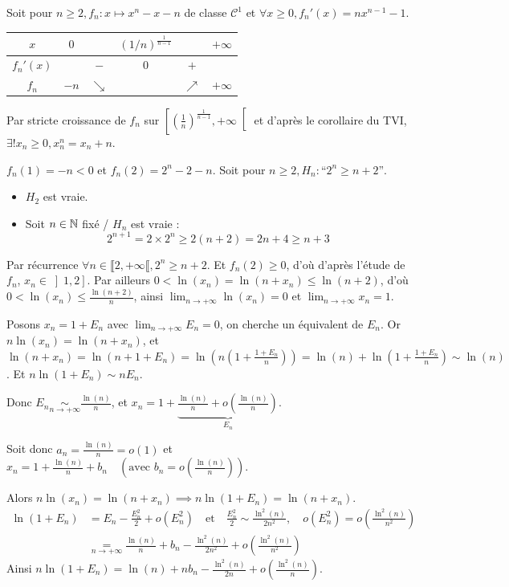 \begin{solution}
Soit pour $n \geq 2, f_n : x \mapsto x^n - x - n$ de classe $\mathcal{C}^1$ et $\forall x \geq 0, f_n'(x) = n x^{n-1} - 1$.
\begin{center}
\begin{tabular}{|c|ccccc|}
\hline
$x$ & $0$ & & $(1/n)^{\frac{1}{n-1}}$ & & $+\infty$ \\
\hline
$f_n'(x)$ & & $-$ & $0$ & $+$ & \\
\hline
$f_n$ & $-n$ & $\searrow$ & & $\nearrow$ & $+\infty$ \\
\hline
\end{tabular}
\end{center}

Par stricte croissance de $f_n$ sur $\left[ \left(\frac{1}{n}\right)^{\frac{1}{n-1}}, +\infty \right[$ et d'après le corollaire du TVI, $\exists! x_n \geq 0, x_n^n = x_n + n$.

$f_n(1) = -n < 0$ et $f_n(2) = 2^n - 2 - n$.
Soit pour $n \geq 2, H_n : \text{“} 2^n \geq n + 2 \text{”}$.
\begin{itemize}
  \item $H_2$ est vraie.
  \item Soit $n \in \mathbb N$ fixé / $H_n$ est vraie :
  \[
  2^{n+1} = 2 \times 2^n \geq 2(n+2) = 2n + 4 \geq n + 3
  \]
\end{itemize}
Par récurrence $\forall n \in \llbracket 2, +\infty \llbracket, 2^n \geq n + 2$.
Et $f_n(2) \geq 0$, d'où d'après l'étude de $f_n$, $x_n \in \left] 1, 2 \right]$.
Par ailleurs $0 < \ln(x_n) = \ln(n + x_n) \leq \ln(n+2)$, d'où $0 < \ln(x_n) \leq \frac{\ln(n+2)}{n}$, ainsi $\lim_{n \to +\infty} \ln(x_n) = 0$ et $\lim_{n \to +\infty} x_n = 1$.

Posons $x_n = 1 + E_n$ avec $\lim_{n \to +\infty} E_n = 0$, on cherche un équivalent de $E_n$.
Or $n \ln(x_n) = \ln(n + x_n)$,
et $\ln(n + x_n) = \ln(n+1 + E_n) = \ln\left( n \left( 1 + \frac{1 + E_n}{n} \right) \right) = \ln(n) + \ln\left( 1 + \frac{1 + E_n}{n} \right) \sim \ln(n)$.
Et $n \ln(1 + E_n) \sim n E_n$.

Donc $E_n \underset{n \to +\infty}{\sim} \frac{\ln(n)}{n}$, et $x_n = 1 + \underbrace{\frac{\ln(n)}{n} + o\left(\frac{\ln(n)}{n}\right)}_{E_n}$.

Soit donc $a_n = \frac{\ln(n)}{n} = o(1)$ et $x_n = 1 + \frac{\ln(n)}{n} + b_n \quad \left(\text{avec } b_n = o\left(\frac{\ln(n)}{n}\right)\right)$.

Alors $n \ln(x_n) = \ln(n + x_n) \implies n \ln(1+E_n) = \ln(n+x_n)$.
\begin{align*}
\ln(1 + E_n) &= E_n - \frac{E_n^2}{2} + o(E_n^2) \quad \text{et} \quad \frac{E_n^2}{2} \sim \frac{\ln^2(n)}{2n^2}, \quad o(E_n^2) = o\left(\frac{\ln^2(n)}{n^2}\right) \\
&\underset{n \to +\infty}{=} \frac{\ln(n)}{n} + b_n - \frac{\ln^2(n)}{2n^2} + o\left(\frac{\ln^2(n)}{n^2}\right)
\end{align*}
Ainsi $n \ln(1 + E_n) = \ln(n) + n b_n - \frac{\ln^2(n)}{2n} + o\left(\frac{\ln^2(n)}{n}\right)$.


\end{solution}
